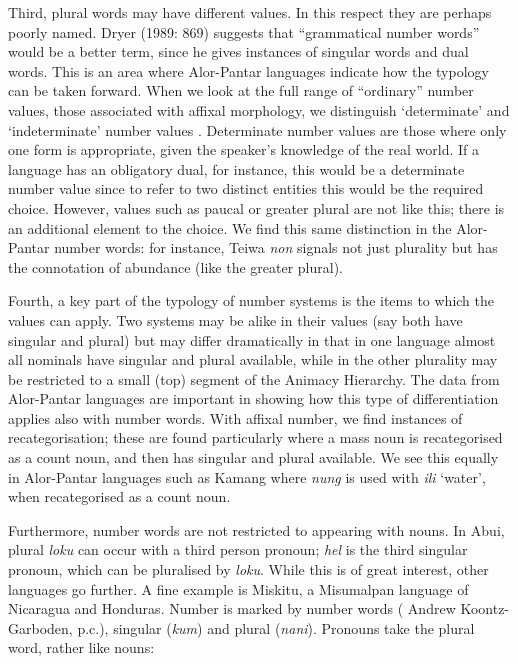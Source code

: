  Third, plural words may have different values. In this respect they are perhaps poorly named. Dryer (1989: 869) suggests that ``grammatical number words'' would be a better term, since he gives instances of singular words and dual words. This is an area where Alor-Pantar languages indicate how the typology can be taken forward. When we look at the full range of ``ordinary'' number values, those associated with affixal morphology, we distinguish `determinate' and `indeterminate' number values \citep[39-41]{Corbett2000}. Determinate number values are those where only one form is appropriate, given the speaker's knowledge of the real world. If a language has an obligatory dual, for instance, this would be a determinate number value since to refer to two distinct entities this would be the required choice. However, values such as paucal or greater plural are not like this; there is an additional element to the choice. We find this same distinction in the Alor-Pantar number words: for instance, Teiwa \textit{non
}signals not just plurality but has the connotation of abundance (like the greater plural).

 Fourth, a key part of the typology of number systems is the items to which the values can apply. Two systems may be alike in their values (say both have singular and plural) but may differ dramatically in that in one language almost all nominals have singular and plural available, while in the other plurality may be restricted to a small (top) segment of the Animacy Hierarchy. The data from Alor-Pantar languages are important in showing how this type of differentiation applies also with number words. With affixal number, we find instances of recategorisation; these are found particularly where a mass noun is recategorised as a count noun, and then has singular and plural available. We see this equally in Alor-Pantar languages such as Kamang where \textit{nung} is used with \textit{ili} `water', when recategorised as a count noun.

 Furthermore, number words are not restricted to appearing with nouns. In Abui, plural \textit{loku} can occur with a third person pronoun; \textit{hel} is the third singular pronoun, which can be pluralised by \textit{loku}. While this is of great interest, other languages go further. A fine example is Miskitu, a Misumalpan language of Nicaragua and Honduras. Number is marked by number words ( Andrew Koontz-Garboden, p.c.), singular (\textit{kum}) and plural (\textit{nani}). Pronouns take the plural word, rather like nouns:


